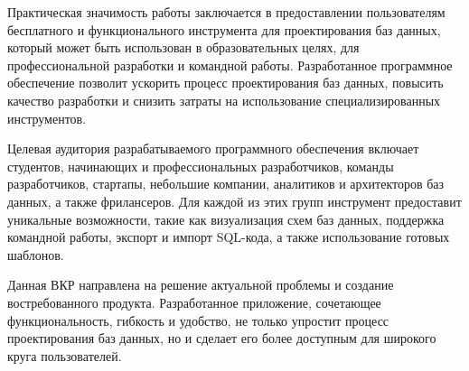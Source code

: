 Практическая значимость работы заключается в предоставлении пользователям бесплатного и функционального инструмента для проектирования баз данных, который может быть использован в образовательных целях, для профессиональной разработки и командной работы. Разработанное программное обеспечение позволит ускорить процесс проектирования баз данных, повысить качество разработки и снизить затраты на использование специализированных инструментов.

Целевая аудитория разрабатываемого программного обеспечения включает студентов, начинающих и профессиональных разработчиков, команды разработчиков, стартапы, небольшие компании, аналитиков и архитекторов баз данных, а также фрилансеров. Для каждой из этих групп инструмент предоставит уникальные возможности, такие как визуализация схем баз данных, поддержка командной работы, экспорт и импорт SQL-кода, а также использование готовых шаблонов.

Данная ВКР направлена на решение актуальной проблемы и создание
востребованного продукта. Разработанное приложение, сочетающее функциональность, гибкость и удобство, не только упростит процесс проектирования баз данных, но и сделает его более доступным для широкого круга пользователей.




